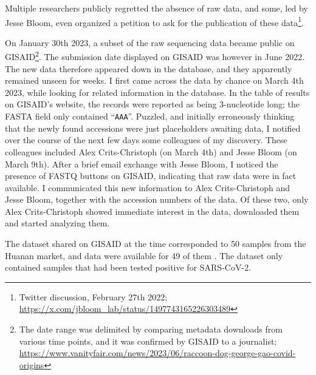 \documentclass[11pt]{article}
\def \sct {\mbox{SARS-CoV-2}}
\begin{document}
Multiple researchers publicly regretted the absence of raw data, and some, led by Jesse Bloom, even organized a petition to ask for the publication of these data\footnote{Twitter discussion, February 27th 2022; \url{https://x.com/jbloom_lab/status/1497743165226303489}}.

On January 30th 2023, a subset of the raw sequencing data became public on GISAID\footnote{The date range was delimited by comparing metadata downloads from various time points, and it was confirmed by GISAID to a journalist; \url{https://www.vanityfair.com/news/2023/06/raccoon-dog-george-gao-covid-origins}}. The submission date displayed on GISAID was however in June 2022. The new data therefore appeared down in the database, and they apparently remained unseen for weeks. I first came across the data by chance on March 4th 2023, while looking for related information in the database. In the table of results on GISAID's website, the records were reported as being 3-nucleotide long; the FASTA field only contained “\texttt{AAA}”. Puzzled, and initially erroneously thinking that the newly found accessions were just placeholders awaiting data, I notified over the course of the next few days some colleagues of my discovery. These colleagues included Alex Crits-Christoph (on March 4th) and Jesse Bloom (on March 9th). After a brief email exchange with Jesse Bloom, I noticed the presence of FASTQ buttons on GISAID, indicating that raw data were in fact available. I communicated this new information to Alex Crits-Christoph and Jesse Bloom, together with the accession numbers of the data. Of these two, only Alex Crits-Christoph showed immediate interest in the data, downloaded them and started analyzing them. 

The dataset shared on GISAID at the time corresponded to 50 samples from the Huanan market, and data were available for 49 of them \citep{ACC2023Zenodo}. The dataset only contained samples that had been tested positive for \sct{}. 
\end{document}
